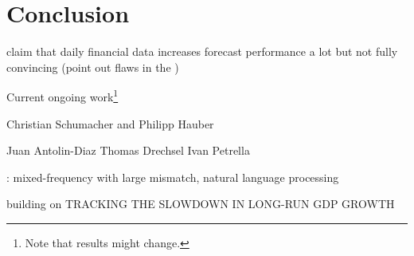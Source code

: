 \chapter{Conclusion} \label{ref:conclusion}


\citet{AndreouEtal2013} claim that daily financial data increases forecast performance a lot but not fully convincing (point out flaws in the )



Current ongoing work\footnote{Note that results might change.}

Christian Schumacher and Philipp Hauber

Juan Antolin-Diaz Thomas Drechsel Ivan Petrella

\citet{Thorsrud2016a,Thorsrud2016b}: mixed-frequency with large mismatch, natural language processing

building on TRACKING THE SLOWDOWN IN LONG-RUN GDP GROWTH